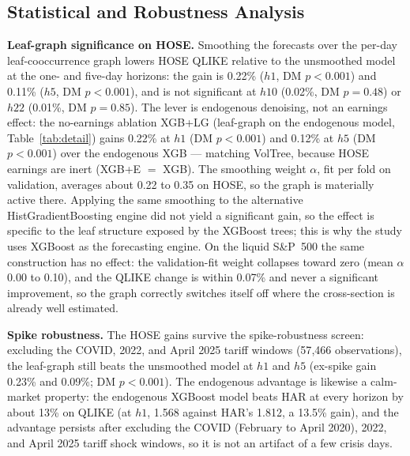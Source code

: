 \documentclass[runningheads]{llncs}
\begin{document}
\subsection{Statistical and Robustness Analysis}\label{sec:robust}
\textbf{Leaf-graph significance on HOSE.} Smoothing the forecasts over the per-day leaf-cooccurrence graph
lowers HOSE QLIKE relative to the unsmoothed model at the one- and five-day
horizons: the gain is 0.22\% ($h1$, DM $p<0.001$) and 0.11\% ($h5$, DM $p<0.001$), and is not
significant at $h10$ (0.02\%, DM $p=0.48$) or $h22$ (0.01\%, DM $p=0.85$).
The lever is endogenous denoising, not an earnings effect: the no-earnings ablation XGB+LG (leaf-graph on
the endogenous model, Table~\ref{tab:detail}) gains 0.22\% at $h1$ (DM $p<0.001$) and 0.12\% at $h5$
(DM $p<0.001$) over the endogenous XGB --- matching VolTree, because HOSE earnings are inert (XGB+E $=$ XGB).
The smoothing weight $\alpha$, fit per fold on validation, averages about 0.22 to 0.35 on HOSE, so the
graph is materially active there. Applying the same smoothing to the alternative HistGradientBoosting
engine did not yield a significant gain, so the effect is specific to the leaf structure exposed by the
XGBoost trees; this is why the study uses XGBoost as the forecasting engine. On the liquid S\&P~500 the
same construction has no effect: the validation-fit weight collapses toward zero (mean $\alpha$ 0.00 to
0.10), and the QLIKE change is within 0.07\% and never a significant improvement, so the graph
correctly switches itself off where the cross-section is already well estimated.

\textbf{Spike robustness.} The HOSE gains survive the spike-robustness screen: excluding the COVID, 2022,
and April 2025 tariff windows (57{,}466 observations), the leaf-graph still beats the unsmoothed model at
$h1$ and $h5$ (ex-spike gain 0.23\% and 0.09\%; DM $p<0.001$).
The endogenous advantage is likewise a calm-market property: the endogenous XGBoost model beats HAR at
every horizon by about 13\% on QLIKE (at $h1$, 1.568 against HAR's 1.812, a 13.5\% gain), and the
advantage persists after excluding the COVID (February to April 2020), 2022, and April 2025 tariff shock
windows, so it is not an artifact of a few crisis days.
\end{document}
